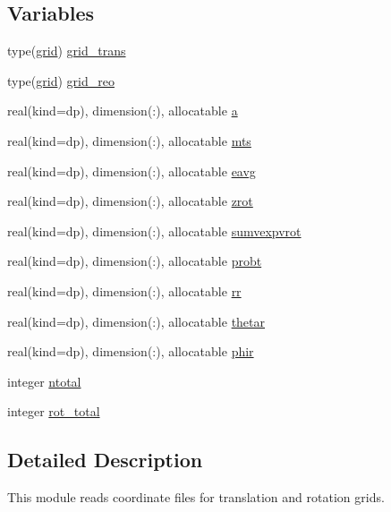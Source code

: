 \subsection*{Variables}
\begin{DoxyCompactItemize}
\item 
type(\hyperlink{structmod__read__grids_1_1grid}{grid}) \hyperlink{namespacemod__read__grids_ab09110371e13fa11f9a839bde8da8fc7}{grid\+\_\+trans}
\item 
type(\hyperlink{structmod__read__grids_1_1grid}{grid}) \hyperlink{namespacemod__read__grids_add45049d527e2c5d636d8382bfe892e8}{grid\+\_\+reo}
\item 
real(kind=dp), dimension(\+:), allocatable \hyperlink{namespacemod__read__grids_a1cd0dd1119fe3ce58917bf6aaf7abebf}{a}
\item 
real(kind=dp), dimension(\+:), allocatable \hyperlink{namespacemod__read__grids_af619057af0e7ce4717a95d4239422912}{mts}
\item 
real(kind=dp), dimension(\+:), allocatable \hyperlink{namespacemod__read__grids_af9747d65a3c7dd6876ab803f0a06e8e9}{eavg}
\item 
real(kind=dp), dimension(\+:), allocatable \hyperlink{namespacemod__read__grids_aa1dc0d4a91ccebc952bde4d1f380b174}{zrot}
\item 
real(kind=dp), dimension(\+:), allocatable \hyperlink{namespacemod__read__grids_aff025afae6b2b208286c65a85cd8f82a}{sumvexpvrot}
\item 
real(kind=dp), dimension(\+:), allocatable \hyperlink{namespacemod__read__grids_a019fc7a33467abb84318794f59bff9cd}{probt}
\item 
real(kind=dp), dimension(\+:), allocatable \hyperlink{namespacemod__read__grids_a668db35acd10bd5a0c686c3ea19da6c2}{rr}
\item 
real(kind=dp), dimension(\+:), allocatable \hyperlink{namespacemod__read__grids_a40918dc75ea77a2757ea8d8dd43beb9e}{thetar}
\item 
real(kind=dp), dimension(\+:), allocatable \hyperlink{namespacemod__read__grids_aa3da94e35a501dc0ed782d7019127514}{phir}
\item 
integer \hyperlink{namespacemod__read__grids_aa54b9eaa554b8519d41c5e616479d343}{ntotal}
\item 
integer \hyperlink{namespacemod__read__grids_aca954e32e5f53302912f372a99affe97}{rot\+\_\+total}
\end{DoxyCompactItemize}


\subsection{Detailed Description}
This module reads coordinate files for translation and rotation grids. 

